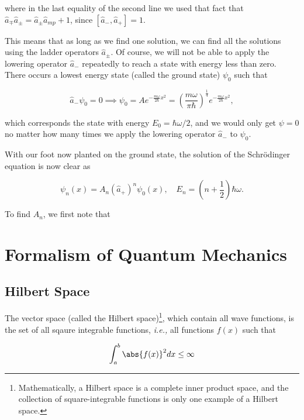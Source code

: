 \documentclass[a4paper,12pt]{report}
\begin{document}
where in the last equality of the second line we used that fact that \(\hat{a} _{\mp} \hat{a} _{\pm } = \hat{a} _{\pm } \hat{a} _{mp} + 1\), since \([\hat{a} _{-}, \hat{a} _{+}  ] = 1\).  

This means that as long as we find one solution, we can find all the solutions using the ladder operators \(\hat{a} _{\pm } \). Of course, we will not be able to apply the lowering operator \(\hat{a} _{-} \) repeatedly to reach a state with energy less than zero. There occurs a lowest energy state (called the ground state) \(\psi _{0} \) such that 

\begin{equation}
  \hat{a} _{-}\psi _{0} = 0 \implies \psi _{0} = Ae^{-\frac{m \omega }{2 \hbar }x^2 } = \left( \frac{m \omega }{\pi \hbar }  \right)^{\frac{1}{4} } e^{-\frac{m \omega }{2 \hbar }x^2 },
\end{equation}

which corresponds the state with energy \( E_{0} = \hbar \omega /2  \), and we would only get \(\psi =0\)  no matter how many times we apply the lowering operator \(\hat{a} _{-} \) to \(\psi _{0} \).

With our foot now planted on the ground state, the solution of the Schrödinger equation is now clear as

\begin{equation}
  \psi _{n}(x) = A_{n} (\hat{a} _{+} )^{n} \psi _{0}(x), \quad E_{n} = \left( n+\frac{1}{2}  \right)\hbar \omega .
\end{equation}

To find \(A_{n} \), we first note that 




\chapter{Formalism of Quantum Mechanics}

\section{Hilbert Space}
The vector space (called the Hilbert space)\footnote{Mathematically, a Hilbert space is a complete inner product space, and the collection of square-integrable functions is only one example of a Hilbert space.}, which contain all wave functions, is the set of all sqaure integrable functions, \textit{i.e.,} all functions \(f(x)\) such that 

\begin{equation}
   \int_{a}^{b}   \abs{f(x)}^2dx \le \infty   
\end{equation}
\end{document}
